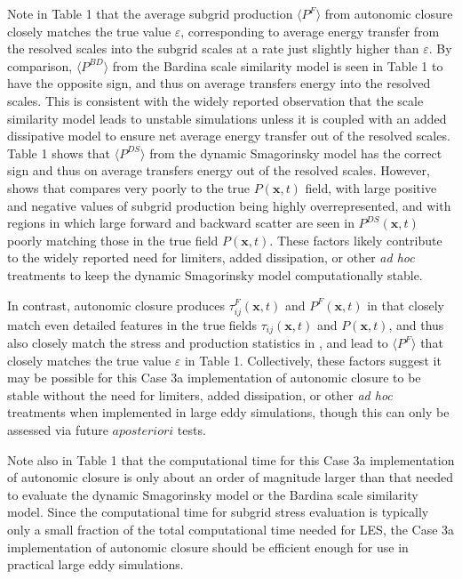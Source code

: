 Note in Table 1 that the average subgrid production $\langle P^F \rangle$  from autonomic closure closely matches the true value $\varepsilon$, corresponding to average energy transfer from the resolved scales into the subgrid scales at a rate just slightly higher than $\varepsilon$. By comparison,  $\langle P^{BD} \rangle$ from the Bardina scale similarity model is seen in Table 1 to have the opposite sign, and thus on average transfers energy into the resolved scales. This is consistent with the widely reported observation that the scale similarity model leads to unstable simulations unless it is coupled with an added dissipative model to ensure net average energy transfer out of the resolved scales. Table 1 shows that $\langle P^{DS} \rangle$  from the dynamic Smagorinsky model has the correct sign and thus on average transfers energy out of the resolved scales. However,  shows that   compares very poorly to the true  $P(\mathbf{x},t)$ field, with large positive and negative values of subgrid production being highly overrepresented, and with regions in which large forward and backward scatter are seen in  $P^{DS}(\mathbf{x},t)$ poorly matching those in the true field $P(\mathbf{x},t)$. These factors likely contribute to the widely reported need for limiters, added dissipation, or other \textit{ad hoc} treatments to keep the dynamic Smagorinsky model computationally stable. 

In contrast, autonomic closure produces $\tau_{ij}^F(\mathbf{x},t)$ and  $P^F(\mathbf{x},t)$ in  that closely match even detailed features in the true fields $\tau_{ij}(\mathbf{x},t)$ and  $P(\mathbf{x},t)$, and thus also closely match the stress and production statistics in , and lead to $\langle P^F \rangle$  that closely matches the true value $\varepsilon$ in Table 1. Collectively, these factors suggest it may be possible for this Case 3a implementation of autonomic closure to be stable without the need for limiters, added dissipation, or other \textit{ad hoc} treatments when implemented in large eddy simulations, though this can only be assessed via future $a posteriori$ tests. 

Note also in Table 1 that the computational time for this Case 3a implementation of autonomic closure is only about an order of magnitude larger than that needed to evaluate the dynamic Smagorinsky model or the Bardina scale similarity model. Since the computational time for subgrid stress evaluation is typically only a small fraction of the total computational time needed for LES, the Case 3a implementation of autonomic closure should be efficient enough for use in practical large eddy simulations.
